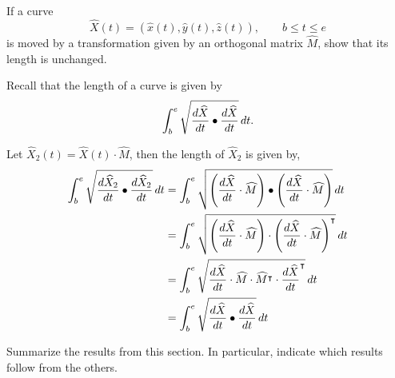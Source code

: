 \documentclass{ximera}
\begin{document}
\begin{problem}
If a curve
\[
\hat{X}(t) = \left(\hat{x}(t),\hat{y}(t),\hat{z}(t)\right),\qquad b\le t\le e
\]
is moved by a transformation given by an orthogonal matrix $\hat{M}$,
show that its length is unchanged.
\begin{hint}
  Recall that the length of a curve is given by
\[
\int_{b}^{e} \sqrt{\frac{d\widehat{X}}{dt} \bullet \frac{d\widehat{X}}{dt}}\,d t.
\]  
\end{hint}

\begin{freeResponse}
Let $\hat{X}_{2}(t) = \hat{X}(t) \cdot \hat{M}$, then the length of $\hat{X}_{2}$ is given by,
\begin{align*}
\int_{b}^{e} \sqrt{\frac{d\widehat{X}_{2}}{dt} \bullet \frac{d\widehat{X}_{2}}{dt}}\,d t 
	&= \int_{b}^{e} \sqrt{ \left( \frac{d\widehat{X}}{dt} \cdot \widehat{M} \right) \bullet 
	\left( \frac{d\widehat{X}}{dt} \cdot \widehat{M} \right)}\,d t \\
	&= \int_{b}^{e} \sqrt{ \left( \frac{d\widehat{X}}{dt} \cdot \widehat{M} \right) \cdot 
	\left( \frac{d\widehat{X}}{dt} \cdot \widehat{M} \right)^\intercal}\,d t \\
	&= \int_{b}^{e} \sqrt{ \frac{d\widehat{X}}{dt} \cdot \widehat{M} \cdot 
	 \widehat{M}^\intercal \cdot \frac{d\widehat{X}}{dt}^\intercal}\,d t \\
	 &= \int_{b}^{e} \sqrt{ \frac{d\widehat{X}}{dt} \bullet \frac{d\widehat{X}}{dt}}\,d t
\end{align*}
\end{freeResponse}
\end{problem}


\begin{problem}
Summarize the results from this section. In particular, indicate which
results follow from the others.
\begin{freeResponse}
\end{freeResponse}
\end{problem}
\end{document}
